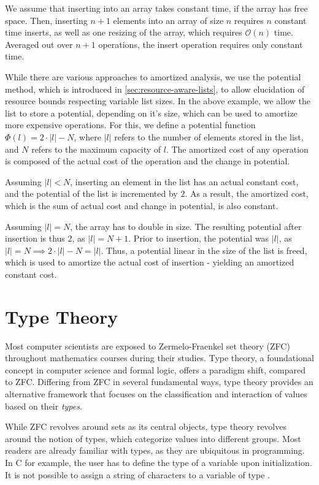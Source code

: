 We assume that inserting into an array takes constant time, if the array has free space. Then, inserting \(n + 1\) elements into an array of size \(n\) requires \(n\) constant time inserts, as well as one resizing of the array, which requires \(\mathcal{O}(n)\) time. Averaged out over \(n + 1\) operations, the insert operation requires only constant time. 

While there are various approaches to amortized analysis, we use the potential method, which is introduced in \cref{sec:resource-aware-lists}, to allow elucidation of resource bounds respecting variable list sizes. In the above example, we allow the list to store a potential, depending on it's size, which can be used to amortize more expensive operations. For this, we define a potential function \(\Phi(l) = 2\cdot |l| - N\), where \(|l|\) refers to the number of elements stored in the list, and \(N\) refers to the maximum capacity of \(l\). The amortized cost of any operation is composed of the actual cost of the operation and the change in potential.

Assuming \(|l| < N\), inserting an element in the list has an actual constant cost, and the potential of the list is incremented by \(2\). As a result, the amortized cost, which is the sum of actual cost and change in potential, is also constant. 

Assuming \(|l| = N\), the array has to double in size. The resulting potential after insertion is thus \(2\), as \(|l| = N + 1\). Prior to insertion, the potential was \(|l|\), as \(|l| = N \implies 2 \cdot |l| - N = |l|\). Thus, a potential linear in the size of the list is freed, which is used to amortize the actual cost of insertion - yielding an amortized constant cost.

\section{Type Theory}\label{sec:type-theory}

Most computer scientists are exposed to Zermelo-Fraenkel set theory (ZFC) throughout mathematics courses during their studies. Type theory, a foundational concept in computer science and formal logic, offers a paradigm shift, compared to ZFC. Differing from ZFC in several fundamental ways, type theory provides an alternative framework that focuses on the classification and interaction of values based on their \emph{types}.

While ZFC revolves around sets as its central objects, type theory revolves around the notion of types, which categorize values into different groups. Most readers are already familiar with types, as they are ubiquitous in programming. In C for example, the user has to define the type of a variable upon initialization. It is not possible to assign a string of characters to a variable of type \typeint.


